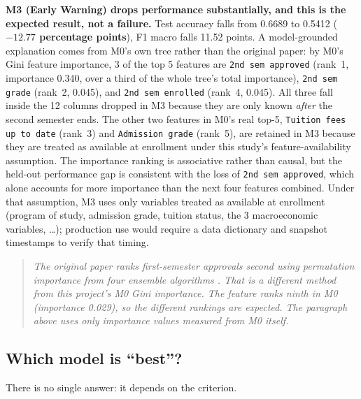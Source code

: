 \textbf{M3 (Early Warning) drops performance substantially, and this is
the expected result, not a failure.} Test accuracy falls from 0.6689 to
0.5412 (\textbf{$-12.77$ percentage points}), F1 macro falls 11.52
points. A model-grounded explanation comes from M0's own tree rather than
the original paper: by M0's Gini feature importance, 3 of the top
5 features are \texttt{2nd sem approved} (rank~1, importance 0.340, over
a third of the whole tree's total importance), \texttt{2nd sem grade}
(rank~2, 0.045), and \texttt{2nd sem enrolled} (rank~4, 0.045). All
three fall inside the 12 columns dropped in M3 because they are only
known \emph{after} the second semester ends. The other two features in
M0's real top-5, \texttt{Tuition fees up to date} (rank~3) and
\texttt{Admission grade} (rank~5), are retained in M3 because they are
treated as available at enrollment under this study's feature-availability
assumption. The importance ranking is associative rather than causal, but the
held-out performance gap is consistent with the loss of
\texttt{2nd sem approved}, which alone accounts for more importance than
the next four features combined. Under that assumption, M3 uses only
variables treated as available at enrollment (program of study, admission
grade, tuition status, the 3 macroeconomic variables, \ldots); production use
would require a data dictionary and snapshot timestamps to verify that timing.

\begin{quote}
\small
\emph{The original paper ranks first-semester approvals second using
permutation importance from four ensemble algorithms
\citep{realinho2022predicting}. That is a different method from this
project's M0 Gini importance. The feature ranks ninth in M0 (importance
0.029), so the different rankings are expected. The paragraph above uses
only importance values measured from M0 itself.}
\end{quote}

\subsection{Which model is ``best''?}

There is no single answer: it depends on the criterion.

